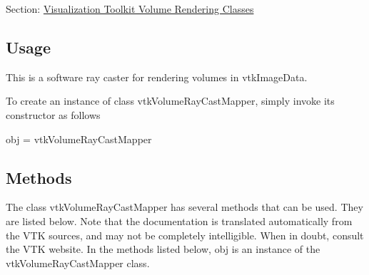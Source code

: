 Section\-: \hyperlink{sec_vtkvolumerendering}{Visualization Toolkit Volume Rendering Classes} \hypertarget{vtkwidgets_vtkxyplotwidget_Usage}{}\subsection{Usage}\label{vtkwidgets_vtkxyplotwidget_Usage}
This is a software ray caster for rendering volumes in vtk\-Image\-Data.

To create an instance of class vtk\-Volume\-Ray\-Cast\-Mapper, simply invoke its constructor as follows \begin{DoxyVerb}  obj = vtkVolumeRayCastMapper
\end{DoxyVerb}
 \hypertarget{vtkwidgets_vtkxyplotwidget_Methods}{}\subsection{Methods}\label{vtkwidgets_vtkxyplotwidget_Methods}
The class vtk\-Volume\-Ray\-Cast\-Mapper has several methods that can be used. They are listed below. Note that the documentation is translated automatically from the V\-T\-K sources, and may not be completely intelligible. When in doubt, consult the V\-T\-K website. In the methods listed below, {\ttfamily obj} is an instance of the vtk\-Volume\-Ray\-Cast\-Mapper class. 
